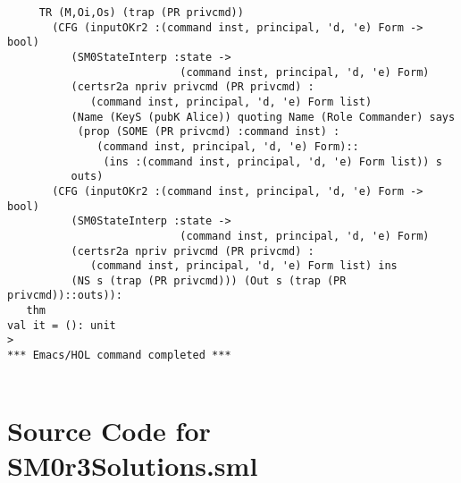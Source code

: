 \documentclass{report}
\begin{document}
\begin{session}
\begin{scriptsize}
\begin{verbatim}
     TR (M,Oi,Os) (trap (PR privcmd))
       (CFG (inputOKr2 :(command inst, principal, 'd, 'e) Form -> bool)
          (SM0StateInterp :state ->
                           (command inst, principal, 'd, 'e) Form)
          (certsr2a npriv privcmd (PR privcmd) :
             (command inst, principal, 'd, 'e) Form list)
          (Name (KeyS (pubK Alice)) quoting Name (Role Commander) says
           (prop (SOME (PR privcmd) :command inst) :
              (command inst, principal, 'd, 'e) Form)::
               (ins :(command inst, principal, 'd, 'e) Form list)) s
          outs)
       (CFG (inputOKr2 :(command inst, principal, 'd, 'e) Form -> bool)
          (SM0StateInterp :state ->
                           (command inst, principal, 'd, 'e) Form)
          (certsr2a npriv privcmd (PR privcmd) :
             (command inst, principal, 'd, 'e) Form list) ins
          (NS s (trap (PR privcmd))) (Out s (trap (PR privcmd))::outs)):
   thm
val it = (): unit
> 
*** Emacs/HOL command completed ***


\end{verbatim}
  \end{scriptsize}
\end{session}



\appendix{}
\chapter{Source Code for SM0r3Solutions.sml}
\label{cha:source-code}

\end{document}
